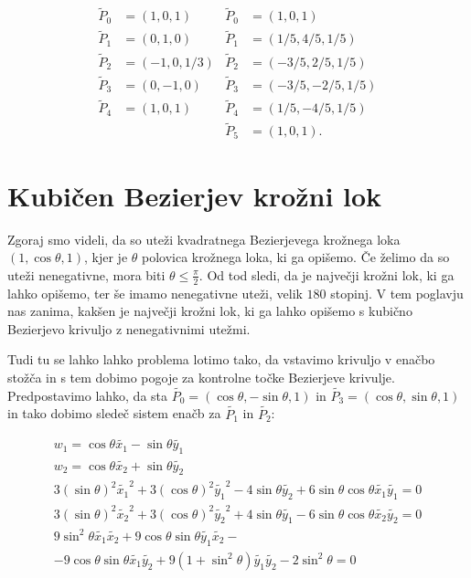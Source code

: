 \documentclass[a4paper,12pt]{article}
\begin{document}
\begin{align*}
\tilde{P}_0 &= (1,0, 1) & \tilde{P}_0 &= (1,0, 1)\\
\tilde{P}_1 &= (0, 1, 0) &\tilde{P}_1 &= (1/5, 4/5, 1/5)\\
\tilde{P}_2 &= (-1, 0, 1/3) &\tilde{P}_2 &= (-3/5, 2/5, 1/5)\\
\tilde{P}_3 &= (0, -1, 0) &\tilde{P}_3 &= (-3/5, -2/5, 1/5)\\
\tilde{P}_4 &= (1, 0, 1) & \tilde{P}_4 &= (1/5, -4/5, 1/5)\\
& & \tilde{P}_5 &= (1, 0, 1).
\end{align*}

\section{Kubičen Bezierjev krožni lok}

Zgoraj smo videli, da so uteži kvadratnega Bezierjevega krožnega loka $(1, \cos \theta, 1)$, kjer je $\theta$ polovica krožnega loka, ki ga opišemo. Če želimo da so uteži nenegativne, mora biti $\theta \leq \frac{\pi}{2}$. Od tod sledi, da je največji krožni lok, ki ga lahko opišemo, ter še imamo nenegativne uteži, velik $180$ stopinj. V tem poglavju nas zanima, kakšen je največji krožni lok, ki ga lahko opišemo s kubično Bezierjevo krivuljo z nenegativnimi utežmi.

Tudi tu se lahko lahko problema lotimo tako, da vstavimo krivuljo v enačbo stožča in s tem dobimo pogoje za kontrolne točke Bezierjeve krivulje. Predpostavimo lahko, da sta $\tilde{P_{0}} = (\cos \theta, -\sin \theta, 1)$ in $\tilde{P_{3}} = (\cos \theta, \sin \theta, 1)$ in tako dobimo sledeč sistem enačb za $\tilde{P_{1}}$ in $\tilde{P_{2}}$:

\begin{align*}
w_{1} = \cos \theta \tilde{x_{1}} - \sin \theta  \tilde{y_{1}} \\
w_{2} = \cos \theta  \tilde{x_{2}} + \sin \theta  \tilde{y_{2}} \\
3(\sin \theta )^{2} \tilde{x_{1}}^2 + 3(\cos \theta )^{2} \tilde{y_{1}}^2 - 4 \sin \theta \tilde{y_{2}} + 6\sin \theta \cos \theta \tilde{x_{1}}\tilde{y_{1}} = 0 \\
3(\sin \theta )^{2} \tilde{x_{2}}^2 + 3(\cos \theta )^{2} \tilde{y_{2}}^2 + 4 \sin \theta \tilde{y_{1}} - 6\sin \theta \cos \theta \tilde{x_{2}}\tilde{y_{2}} = 0 \\
9\sin^{2}\theta \tilde{x_{1}}\tilde{x_{2}} + 9 \cos \theta \sin \theta \tilde{y_{1}}\tilde{x_{2}} -\\ -9\cos \theta \sin \theta \tilde{x_{1}} \tilde{y_{2}} + 9 (1 + \sin^2 \theta) \tilde{y_{1}} \tilde{y_{2}} - 2\sin^2\theta = 0
\end{align*}
\end{document}
